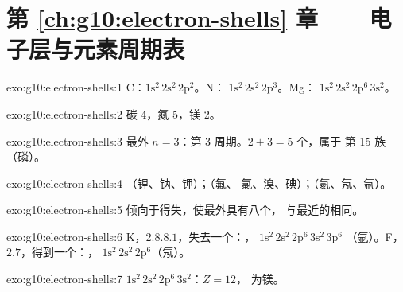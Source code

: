 \section*{第 \ref{ch:g10:electron-shells} 章——电子层与元素周期表}

\begin{solution}{exo:g10:electron-shells:1}
C：$1\mathrm{s}^2\,2\mathrm{s}^2\,2\mathrm{p}^2$。N：
$1\mathrm{s}^2\,2\mathrm{s}^2\,2\mathrm{p}^3$。Mg：
$1\mathrm{s}^2\,2\mathrm{s}^2\,2\mathrm{p}^6\,3\mathrm{s}^2$。
\end{solution}

\begin{solution}{exo:g10:electron-shells:2}
碳 4，氮 5，镁 2。
\end{solution}

\begin{solution}{exo:g10:electron-shells:3}
最外 $n = 3$：第 3 周期。$2 + 3 = 5$ 个，属于
第 15 族（磷）。
\end{solution}

\begin{solution}{exo:g10:electron-shells:4}
（锂、钠、钾）；（氟、
氯、溴、碘）；（氦、氖、氩）。
\end{solution}

\begin{solution}{exo:g10:electron-shells:5}
倾向于得失，使最外具有八个，
与最近的相同。
\end{solution}

\begin{solution}{exo:g10:electron-shells:6}
K，$2.8.8.1$，失去一个：，
$1\mathrm{s}^2\,2\mathrm{s}^2\,2\mathrm{p}^6\,3\mathrm{s}^2\,3\mathrm{p}^6$
（氩）。F，$2.7$，得到一个：，
$1\mathrm{s}^2\,2\mathrm{s}^2\,2\mathrm{p}^6$（氖）。
\end{solution}

\begin{solution}{exo:g10:electron-shells:7}
$1\mathrm{s}^2\,2\mathrm{s}^2\,2\mathrm{p}^6\,3\mathrm{s}^2$：$Z = 12$，
为镁。
\end{solution}

